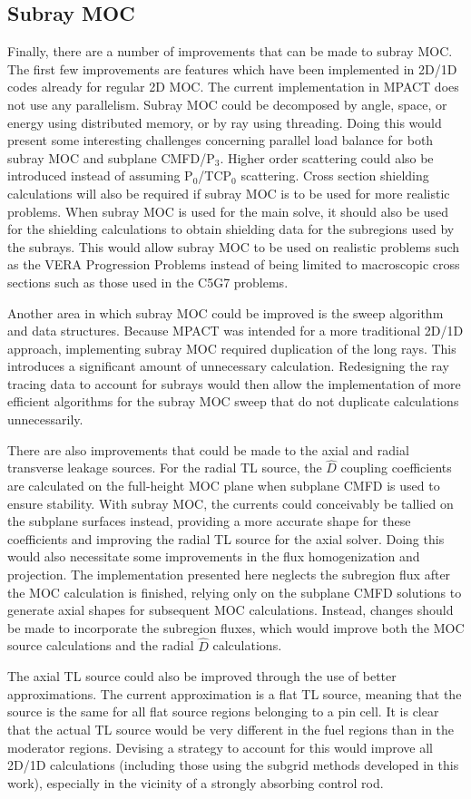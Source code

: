 \subsection{Subray MOC}

Finally, there are a number of improvements that can be made to subray MOC.  The first few improvements are features which have been implemented in 2D/1D codes already for regular 2D MOC.  The current implementation in MPACT does not use any parallelism.  Subray MOC could be decomposed by angle, space, or energy using distributed memory, or by ray using threading.  Doing this would present some interesting challenges concerning parallel load balance for both subray MOC and subplane CMFD/P$_3$.  Higher order scattering could also be introduced instead of assuming P$_0$/TCP$_0$ scattering.  Cross section shielding calculations will also be required if subray MOC is to be used for more realistic problems.  When subray MOC is used for the main solve, it should also be used for the shielding calculations to obtain shielding data for the subregions used by the subrays.  This would allow subray MOC to be used on realistic problems such as the VERA Progression Problems instead of being limited to macroscopic cross sections such as those used in the C5G7 problems.

Another area in which subray MOC could be improved is the sweep algorithm and data structures.  Because MPACT was intended for a more traditional 2D/1D approach, implementing subray MOC required duplication of the long rays.  This introduces a significant amount of unnecessary calculation.  Redesigning the ray tracing data to account for subrays would then allow the implementation of more efficient algorithms for the subray MOC sweep that do not duplicate calculations unnecessarily.

There are also improvements that could be made to the axial and radial transverse leakage sources.  For the radial TL source, the $\hat{D}$ coupling coefficients are calculated on the full-height MOC plane when subplane CMFD is used to ensure stability.  With subray MOC, the currents could conceivably be tallied on the subplane surfaces instead, providing a more accurate shape for these coefficients and improving the radial TL source for the axial solver.  Doing this would also necessitate some improvements in the flux homogenization and projection.  The implementation presented here neglects the subregion flux after the MOC calculation is finished, relying only on the subplane CMFD solutions to generate axial shapes for subsequent MOC calculations.  Instead, changes should be made to incorporate the subregion fluxes, which would improve both the MOC source calculations and the radial $\hat{D}$ calculations.

The axial TL source could also be improved through the use of better approximations.  The current approximation is a flat TL source, meaning that the source is the same for all flat source regions belonging to a pin cell.  It is clear that the actual TL source would be very different in the fuel regions than in the moderator regions.  Devising a strategy to account for this would improve all 2D/1D calculations (including those using the subgrid methods developed in this work), especially in the vicinity of a strongly absorbing control rod.